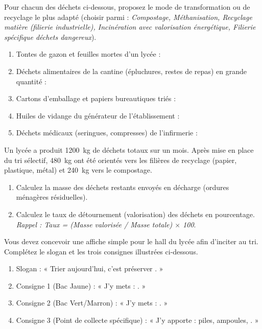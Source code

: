 \documentclass[11pt]{article}
\begin{document}
\begin{exercice}
Pour chacun des déchets ci-dessous, proposez le mode de transformation ou de recyclage le plus adapté (choisir parmi : \textit{Compostage, Méthanisation, Recyclage matière (filierie industrielle), Incinération avec valorisation énergétique, Filierie spécifique déchets dangereux}).
\begin{enumerate}
    \item Tontes de gazon et feuilles mortes d'un lycée : \dotfill
    \item Déchets alimentaires de la cantine (épluchures, restes de repas) en grande quantité : \dotfill
    \item Cartons d'emballage et papiers bureautiques triés : \dotfill
    \item Huiles de vidange du générateur de l'établissement : \dotfill
    \item Déchets médicaux (seringues, compresses) de l'infirmerie : \dotfill
\end{enumerate}
\end{exercice}

\begin{exercice}
Un lycée a produit \SI{1200}{kg} de déchets totaux sur un mois. Après mise en place du tri sélectif, \SI{480}{kg} ont été orientés vers les filières de recyclage (papier, plastique, métal) et \SI{240}{kg} vers le compostage.
\begin{enumerate}
    \item Calculez la masse des déchets restants envoyés en décharge (ordures ménagères résiduelles).
    \item Calculez le taux de détournement (valorisation) des déchets en pourcentage. \textit{Rappel : Taux = (Masse valorisée / Masse totale) $\times$ 100}.
\end{enumerate}
\end{exercice}

\begin{exercice}
Vous devez concevoir une affiche simple pour le hall du lycée afin d'inciter au tri. Complétez le slogan et les trois consignes illustrées ci-dessous.
\begin{enumerate}
    \item Slogan : « Trier aujourd'hui, c'est préserver \dotfill . »
    \item Consigne 1 (Bac Jaune) : « J'y mets : \dotfill . »
    \item Consigne 2 (Bac Vert/Marron) : « J'y mets : \dotfill . »
    \item Consigne 3 (Point de collecte spécifique) : « J'y apporte : piles, ampoules, \dotfill . »
\end{enumerate}
\end{exercice}
\end{document}

